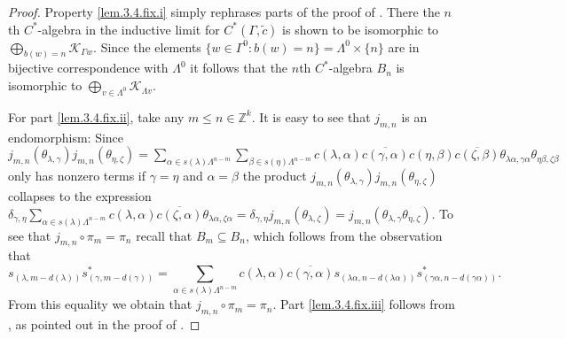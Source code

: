 \documentclass[a4paper, 12pt]{amsart}
\numberwithin{equation}{section}
\theoremstyle{remark}
\theoremstyle{definition}
\begin{document}
\begin{proof}
Property \eqref{lem.3.4.fix.i} simply rephrases parts of the proof of \cite[Lemma~8.4]{MR3335414}. There
the $n$th $C^*$-algebra in the inductive limit for $C^*(\Gamma, \tilde{c})$ is shown to
be isomorphic to $\bigoplus_{b(w)=n} {\mathcal{K}}_{\Gamma w}$. Since the elements $\{w\in
\Gamma^0: b(w)=n\}=\Lambda^0\times \{n\}$ are in bijective correspondence with $\Lambda^0$ it follows that the
$n$th $C^*$-algebra $B_n$ is isomorphic to $\bigoplus_{v\in \Lambda^0} {\mathcal{K}}_{\Lambda v}$.

For part \eqref{lem.3.4.fix.ii}, take any  $m\leq n\in {\mathbb{Z}}^k$. It is easy to see that $j_{m,n}$ is an
endomorphism: Since
$j_{m,n}(\theta_{\lambda,\gamma})j_{m,n}(\theta_{\eta,\zeta})=\sum_{\alpha\in
s(\lambda)\Lambda^{n-m}}\sum_{\beta\in
s(\eta)\Lambda^{n-m}}c(\lambda,\alpha)\overline{c(\gamma,\alpha)}c(\eta,\beta)\overline{c(\zeta,\beta)}\theta_{\lambda\alpha,\gamma\alpha}\theta_{\eta\beta,\zeta\beta}$
only has nonzero terms if $\gamma=\eta$ and $\alpha=\beta$ the product
$j_{m,n}(\theta_{\lambda,\gamma})j_{m,n}(\theta_{\eta,\zeta})$ collapses to the
expression $\delta_{\gamma,\eta}\sum_{\alpha\in
s(\lambda)\Lambda^{n-m}}c(\lambda,\alpha)\overline{c(\zeta,\alpha)}\theta_{\lambda\alpha,\zeta\alpha}=\delta_{\gamma,\eta}j_{m,n}(\theta_{\lambda,\zeta})=j_{m,n}(\theta_{\lambda,\gamma}\theta_{\eta,\zeta})$.
To see that $j_{m,n}\circ \pi_m=\pi_n$ recall that $B_m \subseteq B_n$, which follows from the
observation that
$$s_{(\lambda,m-d(\lambda))}s_{(\gamma,m-d(\gamma))}^*=\sum_{\alpha\in s(\lambda)\Lambda^{n-m}}c(\lambda,\alpha)\overline{c(\gamma,\alpha)}s_{(\lambda\alpha,n-d(\lambda\alpha))}s_{(\gamma\alpha,n-d(\gamma\alpha))}^*.$$
From this equality we obtain that $j_{m,n}\circ \pi_m=\pi_n$. Part \eqref{lem.3.4.fix.iii}
follows from \cite[Lemma~8.5]{MR3335414}, as pointed out in the proof of \cite[Corollary
8.7]{MR3335414}.
\end{proof}
\end{document}
